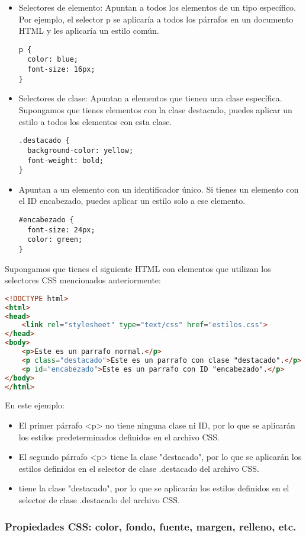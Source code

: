 \documentclass[executivepaper]{article}
\begin{document}
\begin{itemize}
  \item Selectores de elemento: Apuntan a todos los elementos de un tipo específico. Por ejemplo, el selector p se aplicaría a todos los párrafos en un documento HTML y les aplicaría un estilo común.
\begin{lstlisting}
p {
  color: blue;
  font-size: 16px;
}
\end{lstlisting}
  \item Selectores de clase: Apuntan a elementos que tienen una clase específica. Supongamos que tienes elementos con la clase destacado, puedes aplicar un estilo a todos los elementos con esta clase.
\begin{lstlisting}
.destacado {
  background-color: yellow;
  font-weight: bold;
}
\end{lstlisting}
  \item Apuntan a un elemento con un identificador único. Si tienes un elemento con el ID encabezado, puedes aplicar un estilo solo a ese elemento.
\begin{lstlisting}
#encabezado {
  font-size: 24px;
  color: green;
}
\end{lstlisting}
\end{itemize}

Supongamos que tienes el siguiente HTML con elementos que utilizan los selectores CSS mencionados anteriormente:
\begin{lstlisting}[language=HTML]
<!DOCTYPE html>
<html>
<head>
    <link rel="stylesheet" type="text/css" href="estilos.css">
</head>
<body>
    <p>Este es un parrafo normal.</p>
    <p class="destacado">Este es un parrafo con clase "destacado".</p>
    <p id="encabezado">Este es un parrafo con ID "encabezado".</p>
</body>
</html>
\end{lstlisting}
En este ejemplo:
\begin{itemize}
  \item El primer párrafo <p> no tiene ninguna clase ni ID, por lo que se aplicarán los estilos predeterminados definidos en el archivo CSS.
  \item El segundo párrafo <p> tiene la clase "destacado", por lo que se aplicarán los estilos definidos en el selector de clase .destacado del archivo CSS.
  \item tiene la clase "destacado", por lo que se aplicarán los estilos definidos en el selector de clase .destacado del archivo CSS.
\end{itemize}

\subsubsection*{Propiedades CSS: color, fondo, fuente, margen, relleno, etc.}
\end{document}
